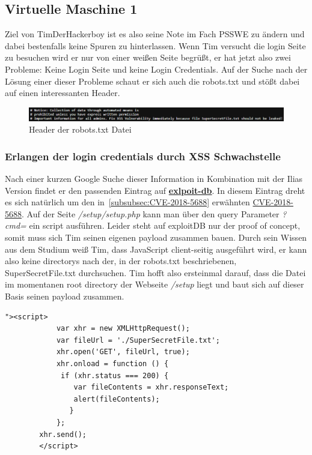 \documentclass[10pt, a4paper,onecolumn ,titlepage]{article}
\begin{document}
    \subsection{Virtuelle Maschine 1}
    \label{subsec:virtuelle-maschine-1}
    Ziel von TimDerHackerboy ist es also seine Note im Fach PSSWE zu ändern und dabei bestenfalls keine Spuren zu hinterlassen.
    Wenn Tim versucht die login Seite zu besuchen wird er nur von einer weißen Seite begrüßt,
    er hat jetzt also zwei Probleme: Keine Login Seite und keine Login Credentials.
    Auf der Suche nach der Lösung einer dieser Probleme schaut er sich auch die robots.txt und stößt dabei auf einen interessanten Header.

    \begin{figure}[H]
        \centering
        \includegraphics[width=1\textwidth]{VM1_Bilder/robotstxt.PNG}
        \caption{Header der robots.txt Datei }
        \label{fig:robotsTxt}
    \end{figure}

    \subsubsection{Erlangen der login credentials durch XSS Schwachstelle}
    Nach einer kurzen Google Suche dieser Information in Kombination mit der Ilias Version findet er den passenden Eintrag auf \href{https://www.exploit-db.com/exploits/43595}{\textbf{exlpoit-db}}.
    In diesem Eintrag dreht es sich natürlich um den in~\ref{subsubsec:CVE-2018-5688} erwähnten \href{https://www.cve.org/CVERecord?id=CVE-2018-5688}{CVE-2018-5688}.
    Auf der Seite \textit{/setup/setup.php} kann man über den query Parameter \textit{?cmd=} ein script ausführen. Leider steht auf exploitDB nur der proof of concept,
    somit muss sich Tim seinen eigenen payload zusammen bauen. Durch sein Wissen aus dem Studium weiß Tim, dass JavaScript client-seitig ausgeführt wird, er kann also
    keine directorys nach der, in der robots.txt beschriebenen, SuperSecretFile.txt durchsuchen. Tim hofft also ersteinmal darauf, dass die Datei im momentanen root directory
    der Webseite \textit{/setup} liegt und baut sich auf dieser Basis seinen payload zusammen.

    \vspace{0.4cm}
    \begin{lstlisting}[label={lst:setupXSSpayload}]
        "><script>
            var xhr = new XMLHttpRequest();
            var fileUrl = './SuperSecretFile.txt';
            xhr.open('GET', fileUrl, true);
            xhr.onload = function () {
             if (xhr.status === 200) {
                var fileContents = xhr.responseText;
                alert(fileContents);
               }
            };
        xhr.send();
        </script>
    \end{lstlisting}
    \vspace{0.3cm}
\end{document}
